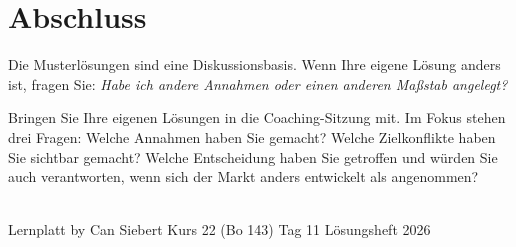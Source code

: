 \documentclass[11pt,a4paper,oneside]{article}
\begin{document}
\clearpage

\section*{Abschluss}
\thispagestyle{plain}

\noindent Die Musterlösungen sind eine Diskussionsbasis. Wenn Ihre eigene Lösung anders ist, fragen Sie: \emph{Habe ich andere Annahmen \textendash{} oder einen anderen Maßstab angelegt?}

\medskip
\begin{infobox}
Bringen Sie Ihre eigenen Lösungen in die Coaching-Sitzung mit. Im Fokus stehen drei Fragen: Welche Annahmen haben Sie gemacht? Welche Zielkonflikte haben Sie sichtbar gemacht? Welche Entscheidung haben Sie getroffen \textendash{} und würden Sie auch verantworten, wenn sich der Markt anders entwickelt als angenommen?
\end{infobox}

\vspace{1cm}
\noindent{\color{lpAccent}\rule{\linewidth}{0.6pt}}\\[4pt]
{\footnotesize\sffamily\color{lpGray}Lernplatt \textperiodcentered{} by Can Siebert \textperiodcentered{} Kurs 22 (Bo 143) \textperiodcentered{} Tag 11 \textperiodcentered{} Lösungsheft \textperiodcentered{} \textcopyright{} 2026}
\end{document}
